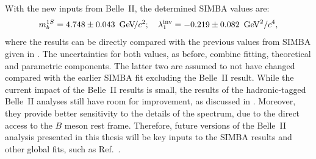 With the new inputs from Belle~II, the determined SIMBA values are:
\begin{equation}\label{eq:new_simba_values}
    m_b^{1S}= 4.748\pm0.043~{\mathrm{\,Ge\kern -0.1em V\!/}c^2}; \quad \lambda_1^{\mathrm{inv}} = -0.219\pm0.082~\mathrm{\,Ge\kern -0.1em V}^2/c^4,
\end{equation}
where the results can be directly compared with the previous values from SIMBA given in .
The uncertainties for both values, as before, combine fitting, theoretical and parametric components.
The latter two are assumed to not have changed compared with the earlier SIMBA fit excluding the Belle~II result.
While the current impact of the Belle~II results is small, the results of the hadronic-tagged Belle~II analyses still have room for improvement, as discussed in .
Moreover, they provide better sensitivity to the details of the \EB spectrum, due to the direct access to the $B$ meson rest frame.
Therefore, future versions of the Belle~II analysis presented in this thesis will be key inputs to the SIMBA results and other global fits, such as Ref.~\cite{Haller:2018nnx}.